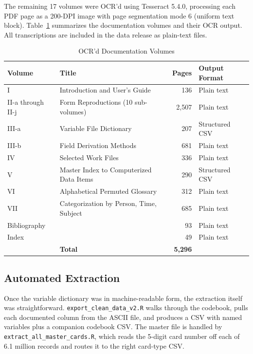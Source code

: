 \documentclass[12pt]{article}
\begin{document}
The remaining 17 volumes were OCR'd using Tesseract 5.4.0, processing each PDF page as a 200-DPI image with page segmentation mode 6 (uniform text block). Table~\ref{tab:ocr} summarizes the documentation volumes and their OCR output. All transcriptions are included in the data release as plain-text files.

\begin{table}[H]
\centering
\caption{OCR'd Documentation Volumes}
\label{tab:ocr}
\small
\begin{tabular}{llrl}
\toprule
Volume & Title & Pages & Output Format \\
\midrule
I & Introduction and User's Guide & 136 & Plain text \\
II-a through II-j & Form Reproductions (10 sub-volumes) & 2,507 & Plain text \\
III-a & Variable File Dictionary & 207 & Structured CSV \\
III-b & Field Derivation Methods & 681 & Plain text \\
IV & Selected Work Files & 336 & Plain text \\
V & Master Index to Computerized Data Items & 290 & Structured CSV \\
VI & Alphabetical Permuted Glossary & 312 & Plain text \\
VII & Categorization by Person, Time, Subject & 685 & Plain text \\
Bibliography & & 93 & Plain text \\
Index & & 49 & Plain text \\
\midrule
& \textbf{Total} & \textbf{5,296} & \\
\bottomrule
\end{tabular}
\end{table}

\subsection{Automated Extraction}

Once the variable dictionary was in machine-readable form, the extraction itself was straightforward. \texttt{export\_clean\_data\_v2.R} walks through the codebook, pulls each documented column from the ASCII file, and produces a CSV with named variables plus a companion codebook CSV. The master file is handled by \texttt{extract\_all\_master\_cards.R}, which reads the 5-digit card number off each of 6.1 million records and routes it to the right card-type CSV.
\end{document}
